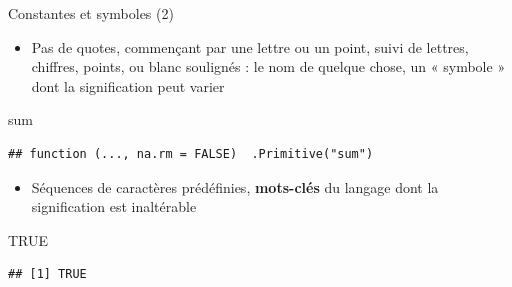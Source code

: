 \documentclass[
  ignorenonframetext,
]{beamer}
\newenvironment{Shaded}{\begin{snugshade}}{\end{snugshade}}
\newcommand{\ConstantTok}[1]{\textcolor[rgb]{0.56,0.35,0.01}{#1}}
\newcommand{\NormalTok}[1]{#1}
\providecommand{\tightlist}{%
  \setlength{\itemsep}{0pt}\setlength{\parskip}{0pt}}
\begin{document}
\begin{frame}[fragile]{Constantes et symboles (2)}
\protect\hypertarget{constantes-et-symboles-2}{}
\begin{itemize}
\tightlist
\item
  Pas de quotes, commençant par une lettre ou un point, suivi de
  lettres, chiffres, points, ou blanc soulignés : le nom de quelque
  chose, un « symbole » dont la signification peut varier
\end{itemize}

\tiny

\begin{Shaded}
\begin{Highlighting}[]
\NormalTok{sum}
\end{Highlighting}
\end{Shaded}

\begin{verbatim}
## function (..., na.rm = FALSE)  .Primitive("sum")
\end{verbatim}

\normalsize

\begin{itemize}
\tightlist
\item
  Séquences de caractères prédéfinies, \textbf{mots-clés} du langage
  dont la signification est inaltérable
\end{itemize}

\tiny

\begin{Shaded}
\begin{Highlighting}[]
\ConstantTok{TRUE}
\end{Highlighting}
\end{Shaded}

\begin{verbatim}
## [1] TRUE
\end{verbatim}

\normalsize
\end{frame}
\end{document}

